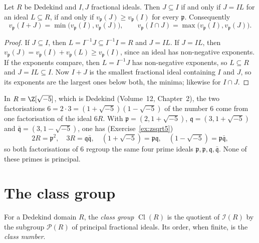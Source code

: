 \begin{corollary}\label{cor:contain}
Let $R$ be Dedekind and $I,J$ fractional ideals. Then $J\subseteq I$ if and only if $J=IL$ for an ideal $L\subseteq R$, if and only if $v_{\mathfrak p}(J)\ge v_{\mathfrak p}(I)$ for every $\mathfrak p$. Consequently
\[
v_{\mathfrak p}(I+J)=\min\bigl(v_{\mathfrak p}(I),v_{\mathfrak p}(J)\bigr),\qquad v_{\mathfrak p}(I\cap J)=\max\bigl(v_{\mathfrak p}(I),v_{\mathfrak p}(J)\bigr).
\]
\end{corollary}

\begin{proof}
If $J\subseteq I$, then $L=I^{-1}J\subseteq I^{-1}I=R$ and $J=IL$. If $J=IL$, then $v_{\mathfrak p}(J)=v_{\mathfrak p}(I)+v_{\mathfrak p}(L)\ge v_{\mathfrak p}(I)$, since an ideal has non-negative exponents. If the exponents compare, then $L=I^{-1}J$
has non-negative exponents, so $L\subseteq R$ and $J=IL\subseteq I$. Now $I+J$ is the smallest fractional ideal containing $I$ and $J$, so its exponents are the largest ones below both, the minima; likewise for $I\cap J$.
\end{proof}

\begin{example}\label{ex:sixtwice}
In $R=\Z[\sqrt{-5}]$, which is Dedekind (Volume~12, Chapter~2), the two factorisations $6=2\cdot3=(1+\sqrt{-5})(1-\sqrt{-5})$ of the number $6$ come from one factorisation of the ideal $6R$. With
$\mathfrak p=(2,1+\sqrt{-5})$, $\mathfrak q=(3,1+\sqrt{-5})$ and $\bar{\mathfrak q}=(3,1-\sqrt{-5})$, one has (Exercise~\ref{ex:zsqrt5})
\[
2R=\mathfrak p^2,\quad 3R=\mathfrak q\bar{\mathfrak q},\quad (1+\sqrt{-5})=\mathfrak p\mathfrak q,\quad(1-\sqrt{-5})=\mathfrak p\bar{\mathfrak q},
\]
so both factorisations of $6$ regroup the same four prime ideals $\mathfrak p,\mathfrak p,\mathfrak q,\bar{\mathfrak q}$. None of these primes is principal.
\end{example}

\section{The class group}

\begin{definition}\label{def:classgroup}
For a Dedekind domain $R$, the \emph{class group} $\operatorname{Cl}(R)$ is the quotient of $\mathcal I(R)$ by the subgroup $\mathcal P(R)$ of principal fractional ideals. Its order, when finite, is the \emph{class number}.
\end{definition}

